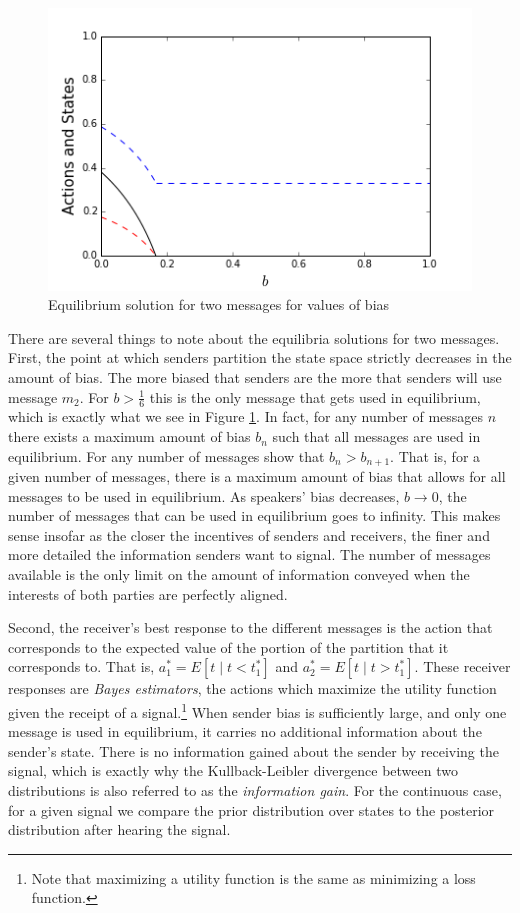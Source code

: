 \documentclass[12pt]{upenndiss}
\theoremstyle{definition} \newtheorem{definition}{Definition}
\begin{document}
\begin{figure}
	\includegraphics{sol2-beta.png}
	\caption{Equilibrium solution for two messages for values of bias}
	\label{sol2-beta}
\end{figure}

There are several things to note about the equilibria solutions for two messages. First, the point at which senders partition the state space strictly decreases in the amount of bias. The more biased that senders are the more that senders will use message $m_2$. For $ b > \frac{1}{6}$ this is the only message that gets used in equilibrium, which is exactly what we see in Figure \ref{sol2-beta}. In fact, for any number of messages $n$ there exists a maximum amount of bias $b_n$ such that all messages are used in equilibrium. For any number of messages \cite{crawford-sobel:1982} show that $b_n > b_{n+1}$. That is, for a given number of messages, there is a maximum amount of bias that allows for all messages to be used in equilibrium. As speakers' bias decreases, $b \rightarrow 0$, the number of messages that can be used in equilibrium goes to infinity. This makes sense insofar as the closer the incentives of senders and receivers, the finer and more detailed the information senders want to signal. The number of messages available is the only limit on the amount of information conveyed when the interests of both parties are perfectly aligned.

Second, the receiver's best response to the different messages is the action that corresponds to the expected value of the portion of the partition that it corresponds to. That is, $a_1^* = E[t \mid t < t_1^*]$ and $a_2^* = E[t \mid t > t_1^*]$. These receiver responses are \emph{Bayes estimators}, the actions which maximize the utility function given the receipt of a signal.\footnote{Note that maximizing a utility function is the same as minimizing a loss function.} When sender bias is sufficiently large, and only one message is used in equilibrium, it carries no additional information about the sender's state. There is no information gained about the sender by receiving the signal, which is exactly why the Kullback-Leibler divergence between two distributions is also referred to as the \emph{information gain}.  For the continuous case, for a given signal we compare the prior distribution over states to the posterior distribution after hearing the signal.
\end{document}
